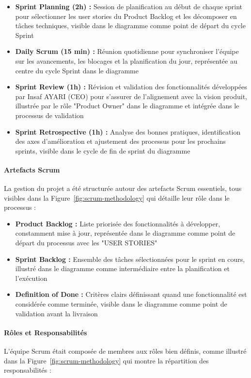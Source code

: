 \documentclass[12pt,a4paper]{article}
\begin{document}
\begin{itemize}
    \item \textbf{Sprint Planning (2h) :} Session de planification au début de chaque sprint pour sélectionner les user stories du Product Backlog et les décomposer en tâches techniques, visible dans le diagramme comme point de départ du cycle Sprint
    \item \textbf{Daily Scrum (15 min) :} Réunion quotidienne pour synchroniser l'équipe sur les avancements, les blocages et la planification du jour, représentée au centre du cycle Sprint dans le diagramme
    \item \textbf{Sprint Review (1h) :} Révision et validation des fonctionnalités développées par Insaf AYARI (CEO) pour s'assurer de l'alignement avec la vision produit, illustrée par le rôle "Product Owner" dans le diagramme et intégrée dans le processus de validation
    \item \textbf{Sprint Retrospective (1h) :} Analyse des bonnes pratiques, identification des axes d'amélioration et ajustement des processus pour les prochains sprints, visible dans le cycle de fin de sprint du diagramme
\end{itemize}

\paragraph{Artefacts Scrum}
La gestion du projet a été structurée autour des artefacts Scrum essentiels, tous visibles dans la Figure~\ref{fig:scrum-methodology} qui détaille leur rôle dans le processus :

\begin{itemize}
    \item \textbf{Product Backlog :} Liste priorisée des fonctionnalités à développer, constamment mise à jour, représentée dans le diagramme comme point de départ du processus avec les "USER STORIES"
    \item \textbf{Sprint Backlog :} Ensemble des tâches sélectionnées pour le sprint en cours, illustré dans le diagramme comme intermédiaire entre la planification et l'exécution
    \item \textbf{Definition of Done :} Critères clairs définissant quand une fonctionnalité est considérée comme terminée, visible dans le diagramme comme point de validation avant la livraison
\end{itemize}

\paragraph{Rôles et Responsabilités}
L'équipe Scrum était composée de membres aux rôles bien définis, comme illustré dans la Figure~\ref{fig:scrum-methodology} qui montre la répartition des responsabilités :
\end{document}
